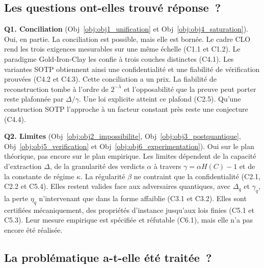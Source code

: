 \begin{sloppypar}
\subsection*{Les questions ont-elles trouv\'e r\'eponse~?}

\textbf{Q1. Conciliation} (Obj~\ref{obj:obj1_unification} et Obj~\ref{obj:obj4_saturation}).
Oui, en partie. La conciliation est possible, mais elle est born\'ee. Le cadre CLO rend
les trois exigences mesurables sur une m\^eme \'echelle (C1.1 et C1.2). Le paradigme
Gold-Iron-Clay les confie \`a trois couches distinctes (C4.1). Les variantes
SOTP obtiennent ainsi une confidentialit\'e et une fiabilit\'e de v\'erification prouv\'ees (C4.2 et
C4.3). Cette conciliation a un prix. La fiabilit\'e de reconstruction tombe \`a l'ordre de
$2^{-\lambda}$ et l'opposabilit\'e que la preuve peut porter reste plafonn\'ee par
$\Delta/\gamma$. Une loi explicite atteint ce plafond (C2.5). Qu'une construction SOTP l'approche \`a un facteur constant pr\`es reste une conjecture (C4.4).

\textbf{Q2. Limites} (Obj~\ref{obj:obj2_impossibilite}, Obj~\ref{obj:obj3_postquantique},
Obj~\ref{obj:obj5_verification} et Obj~\ref{obj:obj6_experimentation}). Oui sur le plan
th\'eorique, pas encore sur le plan empirique. Les limites d\'ependent de la capacit\'e
d'extraction $\Delta$, de la granularit\'e des verdicts $\alpha$ \`a travers
$\gamma = \alpha H(C) - 1$ et de la constante de r\'egime $\kappa$. La r\'egularit\'e $\beta$ ne
contraint que la confidentialit\'e (C2.1, C2.2 et C5.4). Elles restent valides face aux
adversaires quantiques, avec $\Delta_q$ et $\gamma_q$, la perte $\eta_q$ n'intervenant que dans
la forme affaiblie (C3.1 et C3.2). Elles sont certifi\'ees m\'ecaniquement, des propri\'et\'es
d'instance jusqu'aux lois finies (C5.1 et C5.3). Leur mesure empirique est sp\'ecifi\'ee et
r\'efutable (C6.1), mais elle n'a pas encore \'et\'e r\'ealis\'ee.

\subsection*{La probl\'ematique a-t-elle \'et\'e trait\'ee~?}


\end{sloppypar}
